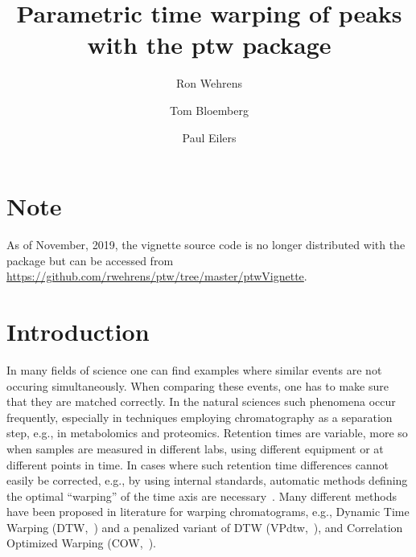 \documentclass[a4paper,11pt]{article}\usepackage[]{graphicx}\usepackage[]{color}
\title{Parametric time warping of peaks with the ptw package}
\author{Ron Wehrens \and Tom Bloemberg \and Paul Eilers}
\begin{document}
\maketitle





\section*{Note}
As of November, 2019, the vignette source code is no longer
distributed with the package but can be accessed from\\
\url{https://github.com/rwehrens/ptw/tree/master/ptwVignette}.

\section{Introduction}
In many fields of science one can find examples where similar events
are not occuring simultaneously. When comparing these events, one has
to make sure that they are matched correctly. In the natural sciences
such phenomena occur frequently,
especially in techniques employing chromatography as a
separation step, e.g., in metabolomics and proteomics. Retention times
are variable, more so when samples are measured in different labs,
using different equipment or at different points in time. In cases
where such retention time differences cannot easily be corrected,
e.g., by using internal standards, automatic methods defining the
optimal ``warping'' of the time axis are necessary~\citet{Bloemberg2013}.
Many different methods have been proposed in literature for warping
chromatograms, e.g., Dynamic Time Warping (DTW,~\citet{Wang1987}) and
a penalized variant of DTW (VPdtw,~\citet{Clifford2012}), and
Correlation Optimized Warping (COW,~\citet{Tomasi2004}).
\end{document}
